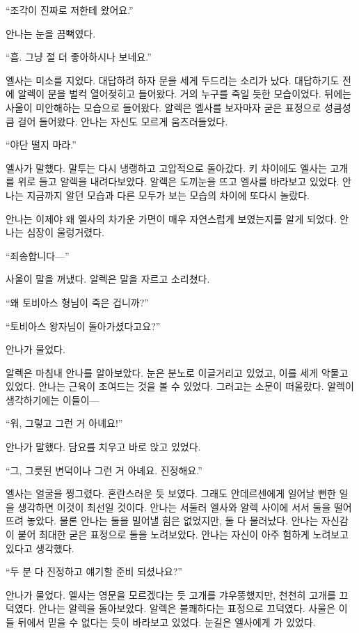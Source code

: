 ``조각이 진짜로 저한테 왔어요.''

안나는 눈을 끔뻑였다.

``흠. 그냥 절 더 좋아하시나 보네요.''

엘사는 미소를 지었다. 대답하려 하자 문을 세게 두드리는 소리가 났다. 대답하기도 전에 알렉이 문을 벌컥 열어젖히고 들어왔다. 거의 누구를 죽일 듯한 모습이었다. 뒤에는 사울이 미안해하는 모습으로 들어왔다. 알렉은 엘사를 보자마자 굳은 표정으로 성큼성큼 걸어 들어왔다. 안나는 자신도 모르게 움츠러들었다.

``야단 떨지 마라.''

엘사가 말했다. 말투는 다시 냉랭하고 고압적으로 돌아갔다. 키 차이에도 엘사는 고개를 위로 들고 알렉을 내려다보았다. 알렉은 도끼눈을 뜨고 엘사를 바라보고 있었다. 안나는 지금까지 알던 모습과 다른 모두가 보는 모습의 차이에 또다시 놀랐다.

안나는 이제야 왜 엘사의 차가운 가면이 매우 자연스럽게 보였는지를 알게 되었다. 안나는 심장이 울렁거렸다.

``죄송합니다—''

사울이 말을 꺼냈다. 알렉은 말을 자르고 소리쳤다.

``왜 토비아스 형님이 죽은 겁니까?''

``토비아스 왕자님이 돌아가셨다고요?''

안나가 물었다.

알렉은 마침내 안나를 알아보았다. 눈은 분노로 이글거리고 있었고, 이를 세게 악물고 있었다. 안나는 근육이 조여드는 것을 볼 수 있었다. 그러고는 소문이 떠올랐다. 알렉이 생각하기에는 이들이—

``워, 그렇고 그런 거 아녜요!''

안나가 말했다. 담요를 치우고 바로 앉고 있었다.

``그, 그릇된 변덕이나 그런 거 아녜요. 진정해요.''

엘사는 얼굴을 찡그렸다. 혼란스러운 듯 보였다. 그래도 안데르센에게 일어날 뻔한 일을 생각하면 이것이 최선일 것이다. 안나는 서둘러 엘사와 알렉 사이에 서서 둘을 떨어뜨려 놓았다. 물론 안나는 둘을 밀어낼 힘은 없었지만, 둘 다 물러났다. 안나는 자신감이 붙어 최대한 굳은 표정으로 둘을 노려보았다. 안나는 자신이 아주 험하게 노려보고 있다고 생각했다.

``두 분 다 진정하고 얘기할 준비 되셨나요?''

안나가 물었다. 엘사는 영문을 모르겠다는 듯 고개를 갸우뚱했지만, 천천히 고개를 끄덕였다. 안나는 알렉을 돌아보았다. 알렉은 불쾌하다는 표정으로 끄덕였다. 사울은 이들 뒤에서 믿을 수 없다는 듯이 바라보고 있었다. 눈길은 엘사에게 가 있었다.

